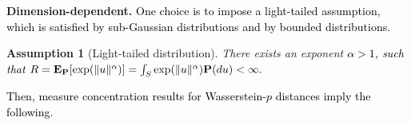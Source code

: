 \documentclass[12pt]{article}
\renewcommand{\paragraph}[1]{\textbf{#1.}\;}
\newcommand{\prob}{{\mathbf P}}
\newcommand{\Expect}{{\mbox{\bf E}}}
\newcommand{\epsnom}{\varepsilon}
\newcommand{\barp}{p}
\newtheorem{assumption}{Assumption}[section]
\newtheorem{theorem}{Theorem}[section]  %
\newcommand{\RC}[1]{\textcolor{black}{#1}}
\newcommand{\RC}[1]{\textcolor{blue}{#1}}
\begin{document}
\paragraph{Dimension-dependent} \RC{One choice is to impose a light-tailed assumption, which is satisfied by sub-Gaussian distributions and by bounded distributions.}
\begin{assumption}[Light-tailed distribution]
\label{ass:light_tail}
    There exists an exponent \RC{$\alpha > 1$, such that
    $R = \Expect_\prob[\exp(\|u\|^{\alpha})] = \int_S \exp(\|u\|^{\alpha})\prob(du) < \infty.$}
\end{assumption}
\RC{Then, measure concentration results for Wasserstein-$\barp$ distances imply the following.}
\end{document}
